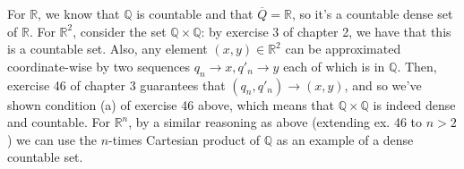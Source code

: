 \begin{solution}
    
    For $\mathbb{R}$, we know that $\mathbb{Q}$ is countable and that $\overline{Q} = \mathbb{R}$, so it's a countable dense set of $\mathbb{R}$.
    For $\mathbb{R}^2$, consider the set $\mathbb{Q} \times \mathbb{Q}$: by exercise 3 of chapter 2, we have that this is a countable set.
    Also, any element $(x, y) \in \mathbb{R}^2$ can be approximated coordinate-wise by two sequences $q_n \rightarrow x, q'_n \rightarrow y$ each of which is in $\mathbb{Q}$.
    Then, exercise 46 of chapter 3 guarantees that $(q_n, q'_n) \rightarrow (x, y)$, and so we've shown condition (a) of exercise 46 above, which means that $\mathbb{Q} \times \mathbb{Q}$ is indeed dense and countable.
    For $\mathbb{R}^n$, by a similar reasoning as above (extending ex. 46 to $n > 2$) we can use the $n$-times Cartesian product of $\mathbb{Q}$ as an example of a dense countable set.
\end{solution}